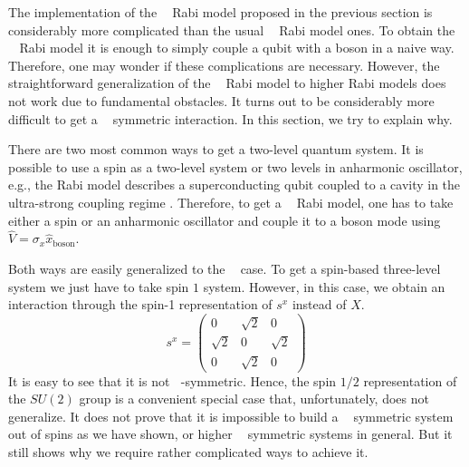 \documentclass[reprint, aps, prx, amsmath, amssymb, longbibliography, superscriptaddress]{revtex4-2}
\DeclareMathOperator{\Zn}{\mathbb{Z}_n}
\DeclareMathOperator{\Zthree}{\mathbb{Z}_3}
\DeclareMathOperator{\Ztwo}{\mathbb{Z}_2}
\begin{document}
The implementation of the $\Zthree$ Rabi model proposed in the previous section is considerably more complicated than the usual $\Ztwo$ Rabi model ones. To obtain the $\Ztwo$ Rabi model it is enough to simply couple a qubit with a boson in a naive way. Therefore, one may wonder if these complications are necessary. However, the straightforward generalization of the $\Ztwo$ Rabi model to higher Rabi models does not work due to fundamental obstacles. It turns out to be considerably more difficult to get a $\Zthree$ symmetric interaction. In this section, we try to explain why.

There are two most common ways to get a two-level quantum system. It is possible to use a spin as a two-level system  \cite{bosco_fully_2022,felicetti_quantum_2017,skogvoll_tunable_2021} or two levels in anharmonic oscillator, e.g., the Rabi model describes a superconducting qubit coupled to a cavity in the ultra-strong coupling regime \cite{niemczyk_circuit_2010,forn-diaz_ultrastrong_2017,yoshihara_superconducting_2017,vlasiuk_cavityinduced_2023, kozin_quantum_2024,chen_singlephotondriven_2017,ricco_reshaping_2022}. Therefore, to get a $\Ztwo$ Rabi model, one has to take either a spin or an anharmonic oscillator and couple it to a boson mode using $\hat V = \sigma_x \hat x_{\text{boson}}$.

Both ways are easily generalized to the $\Zthree$ case. To get a spin-based three-level system we just have to take spin $1$ system. However, in this case, we obtain an interaction through the spin-1 representation of $s^x$ instead of $X$.
\begin{equation}
    s^x= \begin{pmatrix} 0 & \sqrt{2} & 0 \\ \sqrt{2} & 0 & \sqrt{2} \\ 0 & \sqrt{2} & 0 \end{pmatrix}
\end{equation}
It is easy to see that it is not $\Zthree$-symmetric. Hence, the spin $1/2$ representation of the $SU(2)$ group is a convenient special case that, unfortunately, does not generalize. It does not prove that it is impossible to build a $\Zthree$ symmetric system out of spins as we have shown, or higher $\Zn$ symmetric systems \cite{hutter_parafermions_2015} in general. But it still shows why we require rather complicated ways to achieve it.
\end{document}
